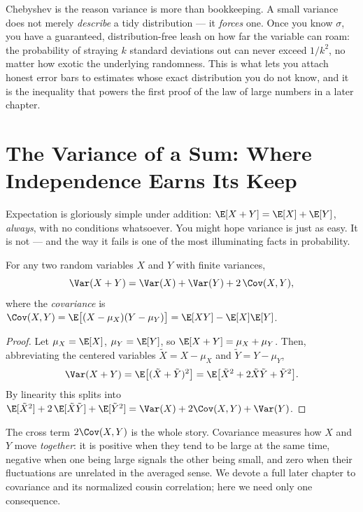 \begin{aestheticbox}
Chebyshev is the reason variance is more than bookkeeping. A small variance
does not merely \emph{describe} a tidy distribution --- it \emph{forces} one.
Once you know $\sigma$, you have a guaranteed, distribution-free leash on how
far the variable can roam: the probability of straying $k$ standard deviations
out can never exceed $1/k^2$, no matter how exotic the underlying randomness.
This is what lets you attach honest error bars to estimates whose exact
distribution you do not know, and it is the inequality that powers the first
proof of the law of large numbers in a later chapter.
\end{aestheticbox}

\section{The Variance of a Sum: Where Independence Earns Its Keep}
\label{ch09:sumindep}

Expectation is gloriously simple under addition: $\E[X+Y] = \E[X] + \E[Y]$,
\emph{always}, with no conditions whatsoever. You might hope variance is just
as easy. It is not --- and the way it fails is one of the most illuminating
facts in probability.

\begin{theorem}
\label{ch09:thm-sum2}
For any two random variables $X$ and $Y$ with finite variances,
\[
  \Var(X+Y) = \Var(X) + \Var(Y) + 2\,\Cov(X,Y),
\]
where the \emph{covariance} is
$\Cov(X,Y) = \E\big[(X-\mu_X)(Y-\mu_Y)\big]
= \E[XY] - \E[X]\E[Y]$.
\end{theorem}

\begin{proof}
Let $\mu_X = \E[X]$, $\mu_Y = \E[Y]$, so $\E[X+Y] = \mu_X + \mu_Y$. Then,
abbreviating the centered variables $\tilde X = X-\mu_X$ and
$\tilde Y = Y-\mu_Y$,
\[
  \Var(X+Y) = \E\big[(\tilde X + \tilde Y)^2\big]
  = \E\big[\tilde X^2 + 2\tilde X\tilde Y + \tilde Y^2\big].
\]
By linearity this splits into
$\E[\tilde X^2] + 2\,\E[\tilde X \tilde Y] + \E[\tilde Y^2]
= \Var(X) + 2\Cov(X,Y) + \Var(Y)$. \qedhere
\end{proof}

The cross term $2\Cov(X,Y)$ is the whole story. Covariance measures how $X$
and $Y$ move \emph{together}: it is positive when they tend to be large at
the same time, negative when one being large signals the other being small,
and zero when their fluctuations are unrelated in the averaged sense. We
devote a full later chapter to covariance and its normalized cousin
correlation; here we need only one consequence.

